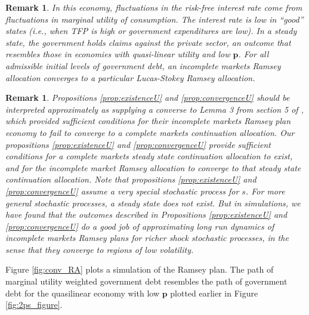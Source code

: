 \documentclass[12pt]{article}
\newcommand{\dge}[1]{\textcolor{blue}{$^{\textrm{dge}}${#1}}}
\newcommand{\tjs}[1]{\textcolor{red}{$^{\textrm{tjs}}${#1}}}
\newtheorem{remark}[theorem]{Remark}
\begin{document}
\begin{remark}
In this economy,  fluctuations in the risk-free  interest rate come from fluctuations in  marginal utility of consumption. The interest rate
 is low  in ``good'' states (i.e., when  TFP is high or government expenditures are low).
 In a steady state, the government holds claims against the private sector, an outcome that resembles those in economies
 with  quasi-linear utility and  low  $\bm{p}$.  For all admissible  initial  levels of government debt, an incomplete markets Ramsey allocation converges to a particular Lucas-Stokey  Ramsey allocation.

\end{remark}
{
\begin{remark}  Propositions \ref{prop:existenceU}  and \ref{prop:convergenceU} should be interpreted approximately as supplying  a converse to Lemma 3 from section 5 of \citet{Aiyagari2002}, which  provided sufficient conditions for their incomplete markets Ramsey plan  economy to {\em fail} to converge to  a complete markets continuation allocation.  Our propositions \ref{prop:existenceU}  and \ref{prop:convergenceU} provide sufficient conditions for a complete markets steady state continuation allocation to exist, and for the incomplete market Ramsey allocation to converge
to that steady state continuation allocation.  %
Note that propositions \ref{prop:existenceU}  and \ref{prop:convergenceU} assume a very special stochastic process for $s$.
  For more general stochastic processes, a steady state does not exist. But in simulations,  we have found that the outcomes described in Propositions \ref{prop:existenceU}  and \ref{prop:convergenceU} do a good job of approximating long run  dynamics of incomplete markets Ramsey plans for
 richer shock stochastic processes, in the sense that they converge to regions of low volatility.
\end{remark}}
Figure \ref{fig:conv_RA} plots a simulation of the Ramsey plan.  The path of marginal utility weighted government debt resembles the path of government debt for the quasilinear economy with low $\bm p$ plotted earlier in Figure \ref{fig:2ps_figure}.
\end{document}
